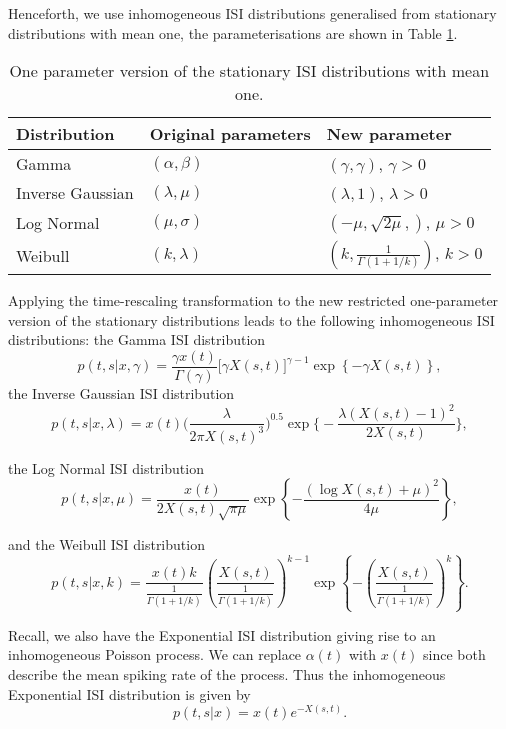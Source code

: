 \documentclass[../main.tex]{subfiles}
\begin{document}
Henceforth, we use inhomogeneous ISI distributions generalised from stationary distributions with mean one, the parameterisations are shown in Table \ref{table:oneparam}. 

\begin{table}[h!]
  \begin{center}
    \begin{tabular}{|l|l|l|}
    \hline
     Distribution & Original parameters & New parameter  \\ \hline
     Gamma & $(\alpha, \beta)$ & $(\gamma, \gamma)$, $\gamma >0$  \\
     Inverse Gaussian & $(\lambda,\mu)$ & $(\lambda, 1)$, $\lambda > 0$  \\
     Log Normal & $(\mu, \sigma)$ & $(-\mu, \sqrt{2\mu},)$, $\mu > 0$   \\
     Weibull & $(k, \lambda)$ & $(k,\frac{1}{\Gamma(1+1/k)})$, $k > 0$ \\ \hline
    \end{tabular}
    \caption{One parameter version of the stationary ISI distributions with mean one. }
        \label{table:oneparam}
  \end{center}
\end{table} 

Applying the time-rescaling transformation to the new restricted one-parameter version of the stationary distributions leads to the following inhomogeneous ISI distributions: the Gamma ISI distribution
$$
 p(t,s| x, \gamma) =  \frac{\gamma x(t)}{\Gamma ( \gamma )} \big[ \gamma X(s,t) \big]^{\gamma -1} \exp \left\{ - \gamma X(s,t)  \right\},
$$
 the Inverse Gaussian ISI distribution
 $$
  p(t,s| x,\lambda) =  x(t) \bigg( \frac{\lambda}{2\pi X(s,t)^3} \bigg)^{0.5} \exp \bigg\{-\frac{\lambda(X(s,t)-1)^2}{2 X(s,t)} \bigg\},
 $$
 
 the Log Normal ISI distribution
 $$
  p(t,s| x, \mu ) = \frac{x(t)}{2 X(s,t) \sqrt{\pi \mu}} \exp \left\{ -\frac{(\log X(s,t) + \mu)^2}{4\mu} \right\},
 $$
  
 and the Weibull ISI distribution
$$
 p(t,s|x,k) = \frac{x(t)k}{\frac{1}{\Gamma(1+1/k)}} \left( \frac{X(s,t)}{\frac{1}{\Gamma(1+1/k)}} \right)^{k-1} \exp \left\{ -\left( \frac{X(s,t)}{\frac{1}{\Gamma(1+1/k)}} \right)^k \right\}.
 $$

Recall, we also have the Exponential ISI distribution giving rise to an inhomogeneous Poisson process. We can replace $\alpha(t)$ with $x(t)$ since both describe the mean spiking rate of the process. Thus the inhomogeneous Exponential ISI distribution is given by
$$
 p(t,s|x) = x(t) e^{-X(s,t)}.
 $$
 
\end{document}
